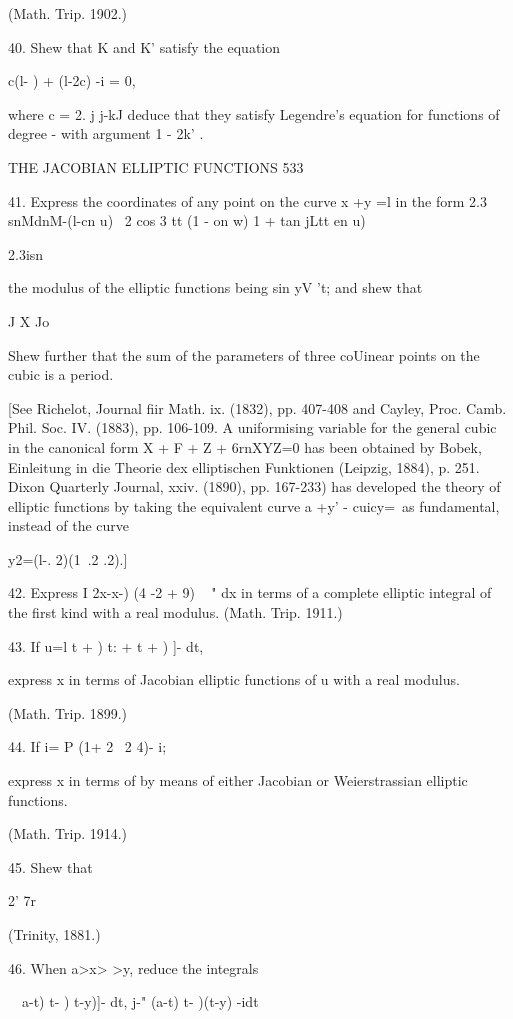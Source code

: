 (Math. Trip. 1902.)

40. Shew that K and K' satisfy the equation

c(l- ) + (l-2c) -i = 0,

where c = 2. j j-kJ deduce that they satisfy Legendre's equation for
functions of degree - with argument 1 - 2k' .

THE JACOBIAN ELLIPTIC FUNCTIONS 533

41. Express the coordinates of any point on the curve x +y =l in the
form 2.3 snMdnM-(l-cn u) \ 2 cos 3 tt (1 - on w) 1 + tan jLtt en u)

2.3isn%

the modulus of the elliptic functions being sin yV 't; and shew that

J X Jo

Shew further that the sum of the parameters of three coUinear points
on the cubic is a period.

[See Richelot, Journal fiir Math. ix. (1832), pp. 407-408 and Cayley,
Proc. Camb. Phil. Soc. IV. (1883), pp. 106-109. A uniformising
variable for the general cubic in the canonical form X + F + Z +
6rnXYZ=0 has been obtained by Bobek, Einleitung in die Theorie dex
elliptischen Funktionen (Leipzig, 1884), p. 251. Dixon Quarterly
Journal, xxiv. (1890), pp. 167-233) has developed the theory of
elliptic functions by taking the equivalent curve a +y' - cuicy=\ as
fundamental, instead of the curve

y2=(l-. 2)(1\ .2 .2).]

42. Express I 2x-x-) (4 -2 + 9) ~ " dx in terms of a complete elliptic
integral of the first kind with a real modulus. (Math. Trip. 1911.)

43. If u=l t + ) t: + t + ) ]- dt,

express x in terms of Jacobian elliptic functions of u with a real
modulus.

(Math. Trip. 1899.)

44. If i= P (1+ 2 \ 2 4)- i;

express x in terms of by means of either Jacobian or Weierstrassian
elliptic functions.

(Math. Trip. 1914.)

45. Shew that

2' 7r

(Trinity, 1881.)

46. When a>x> >y, reduce the integrals

\ \ a-t) t- ) t-y)]- dt, j-" (a-t) t- )(t-y) -idt

